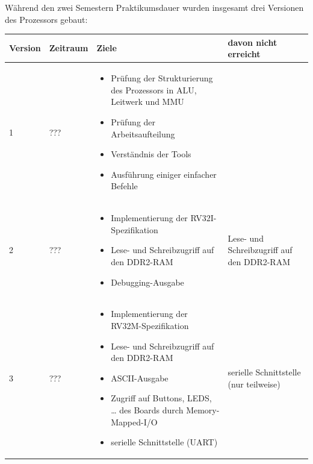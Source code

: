 W\"ahrend den zwei Semestern Praktikumsdauer wurden insgesamt drei Versionen des Prozessors gebaut:


\begin{tabular}{|l|l|p{180pt}|l|}
\hline                                                                                                                                               
Version & Zeitraum & Ziele                                                                            & davon nicht erreicht                          \\
\hline                                                                                                                                               
1       & ???      & \begin{itemize}[noitemsep,topsep=0pt]
                     \item Pr\"ufung der Strukturierung des Prozessors in ALU, Leitwerk und MMU
                     \item Pr\"ufung der Arbeitsaufteilung
                     \item Verst\"andnis der Tools
                     \item Ausf\"uhrung einiger einfacher Befehle
                     \end{itemize}                                                                    &                                               \\
\hline
2       & ???      & \begin{itemize}[noitemsep,topsep=0pt]
                     \item Implementierung der RV32I-Spezifikation
                     \item Lese- und Schreibzugriff auf den DDR2-RAM
                     \item Debugging-Ausgabe
                     \end{itemize}                                                                    & Lese- und Schreibzugriff auf den DDR2-RAM     \\
\hline
3       & ???      & \begin{itemize}[noitemsep,topsep=0pt]
                     \item Implementierung der RV32M-Spezifikation
                     \item Lese- und Schreibzugriff auf den DDR2-RAM
                     \item ASCII-Ausgabe
                     \item Zugriff auf Buttons, LEDS, \dots{} des Boards durch Memory-Mapped-I/O
                     \item serielle Schnittstelle (UART)
                     \end{itemize}                                                                    & serielle Schnittstelle (nur teilweise)        \\
\end{tabular}

